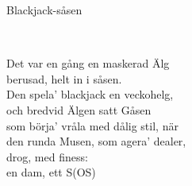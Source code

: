 \begin{song}{Blackjack-såsen}
	
	
	\\
	
	
	Det var en gång en maskerad Älg\\
	berusad, helt in i såsen.\\
	Den spela’ blackjack en veckohelg,\\
	och bredvid Älgen satt Gåsen\\
	som börja’ vråla med dålig stil, när\\
	den runda Musen, som agera’ dealer,\\
	drog, med finess:\\
	en dam, ett S(OS)

	
\end{song}
